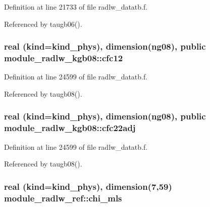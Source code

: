 Definition at line 21733 of file radlw\+\_\+datatb.\+f.



Referenced by taugb06().

\subsubsection[{\texorpdfstring{cfc12}{cfc12}}]{\setlength{\rightskip}{0pt plus 5cm}real (kind=kind\+\_\+phys), dimension(ng08), public module\+\_\+radlw\+\_\+kgb08\+::cfc12}\hypertarget{group__module__radlw__main_ga010239f14788bc1ed9953133e30a62fd}{}\label{group__module__radlw__main_ga010239f14788bc1ed9953133e30a62fd}


Definition at line 24599 of file radlw\+\_\+datatb.\+f.



Referenced by taugb08().

\subsubsection[{\texorpdfstring{cfc22adj}{cfc22adj}}]{\setlength{\rightskip}{0pt plus 5cm}real (kind=kind\+\_\+phys), dimension(ng08), public module\+\_\+radlw\+\_\+kgb08\+::cfc22adj}\hypertarget{group__module__radlw__main_ga38a3ce7d8f3db6b732511cf78ef735db}{}\label{group__module__radlw__main_ga38a3ce7d8f3db6b732511cf78ef735db}


Definition at line 24599 of file radlw\+\_\+datatb.\+f.



Referenced by taugb08().

\subsubsection[{\texorpdfstring{chi\+\_\+mls}{chi_mls}}]{\setlength{\rightskip}{0pt plus 5cm}real (kind=kind\+\_\+phys), dimension(7,59) module\+\_\+radlw\+\_\+ref\+::chi\+\_\+mls}\hypertarget{group__module__radlw__main_gadc2bbd1ac0178afda84e74ad45404d31}{}\label{group__module__radlw__main_gadc2bbd1ac0178afda84e74ad45404d31}


